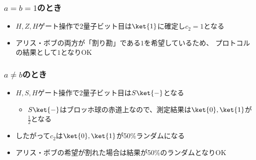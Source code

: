 \begin{frame}
  \frametitle{ $a = b = 1$のとき}

  \begin{figure}
  \end{figure}

  \begin{itemize}
    \item<+-> $H,Z,H$ゲート操作で2量子ビット目は$\ket{1}$に確定し$c_2 = 1$となる

    \item<+-> アリス・ボブの両方が「割り勘」である$1$を希望しているため、
    プロトコルの結果として$1$となりOK
  \end{itemize}
\end{frame}

\begin{frame}
  \frametitle{ $a \ne b$のとき}

  \begin{figure}
  \end{figure}

  \begin{itemize}
    \item<+-> $H,S,H$ゲート操作で2量子ビット目は$S\ket{-}$となる
    \begin{itemize}
      \item $S\ket{-}$はブロッホ球の赤道上なので、測定結果は$\ket{0}, \ket{1}$が$\frac{1}{2}$となる
    \end{itemize}

    \item<+-> したがって$c_2$は$\ket{0}, \ket{1}$が50\%ランダムになる

    \item<+-> アリス・ボブの希望が割れた場合は結果が50\%のランダムとなりOK
  \end{itemize}
\end{frame}

